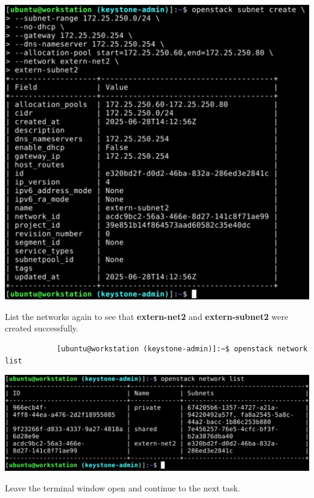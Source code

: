 \documentclass[letterpaper, 12pt]{article}
\begin{document}
\begin{enumerate}
\begin{labstep}
        \begin{center}
            \includegraphics[width=\linewidth]{images/part1/step16.png}
        \end{center}
    \end{labstep}

    \begin{labstep}
        List the networks again to see that \textbf{extern-net2} and \textbf{extern-subnet2} were created successfully.
        \begin{lstlisting}
            [ubuntu@workstation (keystone-admin)]:~$ openstack network list
        \end{lstlisting}

        \begin{center}
            \includegraphics[width=\linewidth]{images/part1/step17.png}
        \end{center}
    \end{labstep}

    \begin{labstep}
        Leave the terminal window open and continue to the next task.
    \end{labstep}

\end{enumerate}
\end{document}
